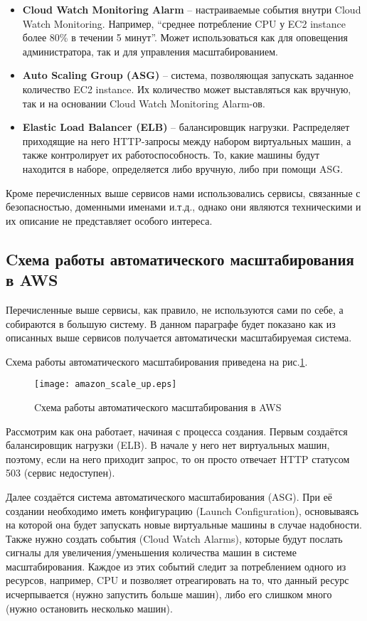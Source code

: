 \begin{itemize}
	\item \textbf{Cloud Watch Monitoring Alarm} -- настраиваемые события внутри Cloud Watch Monitoring. Например, ``среднее потребление CPU у EC2 instance более 80\% в течении 5 минут''. Может использоваться как для оповещения администратора, так и для управления масштабированием.
	\item \textbf{Auto Scaling Group (ASG)} -- система, позволяющая запускать заданное количество EC2 instance. Их количество может выставляться как вручную, так и на основании Cloud Watch Monitoring Alarm-ов.
	\item \textbf{Elastic Load Balancer (ELB)} -- балансировщик нагрузки. Распределяет приходящие на него HTTP-запросы между набором виртуальных машин, а также контролирует их работоспособность. То, какие машины будут находится в наборе, определяется либо вручную, либо при помощи ASG.
\end{itemize}


Кроме перечисленных выше сервисов нами использовались сервисы, связанные с безопасностью, доменными именами и.т.д., однако они являются техническими и их описание не представляет особого интереса.

\subsection{Cхема работы автоматического масштабирования в AWS}
	Перечисленные выше сервисы, как правило, не используются сами по себе, а собираются в большую систему. В данном параграфе будет показано как из описанных выше сервисов получается автоматически масштабируемая система.
	
	Схема работы автоматического масштабирования приведена на рис.\ref{fig:aws_autoscaling}.
	
\begin{figure}[ht]
    \centering
    \texttt{[image: amazon\_scale\_up.eps]} 
    \caption{Cхема работы автоматического масштабирования в AWS}
    \label{fig:aws_autoscaling}
\end{figure}
	Рассмотрим как она работает, начиная с процесса создания. Первым создаётся балансировщик нагрузки (ELB). В начале у него нет виртуальных машин, поэтому, если на него приходит запрос, то он просто отвечает HTTP статусом 503 (сервис недоступен).
	
	Далее создаётся система автоматического масштабирования (ASG). При её создании необходимо иметь конфигурацию (Launch Configuration), основываясь на которой она будет запускать новые виртуальные машины в случае надобности. Также нужно создать события (Cloud Watch Alarms), которые будут послать сигналы для увеличения/уменьшения количества машин в системе масштабирования. Каждое из этих событий следит за потреблением одного из ресурсов, например, CPU и позволяет отреагировать на то, что данный ресурс исчерпывается (нужно запустить больше машин), либо его слишком много (нужно остановить несколько машин).
	
